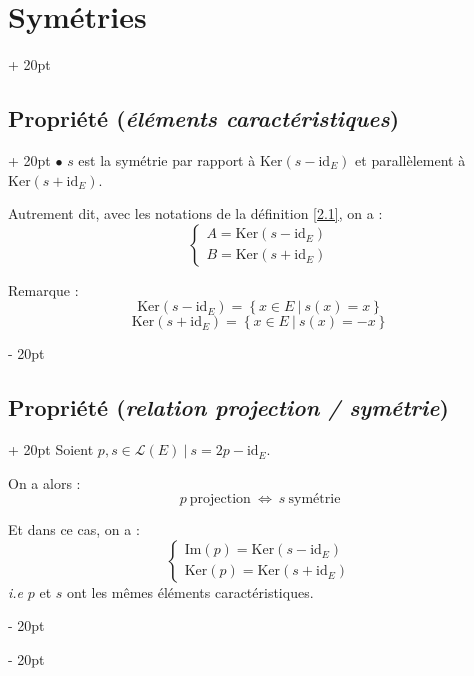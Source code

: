 \documentclass[a4paper, 12pt, twoside]{article}
\newcommand{\set}[1]{\left\{ #1 \right\}}
\newcommand{\ssi}{\ \Leftrightarrow \ }
\newcommand{\ind}[1][20pt]{\advance\leftskip + #1}
\newcommand{\deind}[1][20pt]{\advance\leftskip - #1}
\newenvironment{indt}[2][20pt]{#2 \par \ind[#1]}{\par \deind} %
\begin{document}
\begin{indt}{\section{Symétries}}
\begin{indt}{\subsection{Propriété (\textit{éléments caractéristiques})}}
            $\bullet$ $s$ est la symétrie par rapport à $\mathrm{Ker}(s - \mathrm{id}_E)$ et parallèlement à $\mathrm{Ker}(s + \mathrm{id}_E)$.

            Autrement dit, avec les notations de la définition \ref{2.1}, on a :
            \[
                \begin{cases}
                    A = \mathrm{Ker}(s - \mathrm{id}_E)
                    \\
                    B = \mathrm{Ker}(s + \mathrm{id}_E)
                \end{cases}
            \]

            \vspace{12pt}
            
            Remarque :
            \[
                \mathrm{Ker}(s - \mathrm{id}_E) = \set{x \in E\ |\ s(x) = x}
            \]
            \[
                \mathrm{Ker}(s + \mathrm{id}_E) = \set{x \in E\ |\ s(x) = -x}
            \]
        \end{indt}

        \vspace{12pt}
        
        \begin{indt}{\subsection{Propriété (\textit{relation projection / symétrie})}}
            Soient $p, s \in \mathcal L(E)\ |\ s = 2p - \mathrm{id}_E$.

            On a alors :
            \[
                p\ \text{projection}
                \ssi
                s\ \text{symétrie}
            \]

            Et dans ce cas, on a :
            \[
                \begin{cases}
                    \mathrm{Im}(p) = \mathrm{Ker}(s - \mathrm{id}_E)
                    \\
                    \mathrm{Ker}(p) = \mathrm{Ker}(s + \mathrm{id}_E)
                \end{cases}
            \]
            \textit{i.e} $p$ et $s$ ont les mêmes éléments caractéristiques.
        \end{indt}
    \end{indt}
    
    
    
\end{document}
